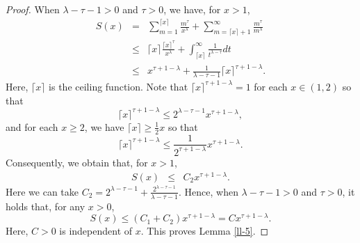 \documentclass[10pt]{amsart}
\theoremstyle{definition}    %
\numberwithin{equation}{section}
\begin{document}
\begin{proof}
When $\lambda-\tau-1>0$ and $\tau>0$, we have, for $x>1$, 
\begin{eqnarray}\label{s-2}
S(x)&=&\sum_{m=1}^{\lceil x \rceil}\frac{m^{\tau}}{x^{\lambda}}+\sum_{m=\lceil x \rceil+1}^{\infty}\frac{m^{\tau}}{m^{\lambda}}\nonumber \\
&\leq&  \lceil x \rceil \frac{\lceil x \rceil^{\tau}}{x^{\lambda}}+\int_{\lceil x \rceil}^{\infty}\frac{1}{t^{\lambda-\tau}}dt\nonumber \\
&\leq & x^{\tau+1-\lambda}+\frac{1}{\lambda-\tau-1}\lceil x \rceil^{\tau+1-\lambda}.\nonumber
\end{eqnarray}
Here, $\lceil x \rceil$ is the ceiling function. Note that $\lceil x \rceil^{\tau+1-\lambda}=1$ for each $x\in (1,2)$ so that
$$\lceil x \rceil^{\tau+1-\lambda}\leq 2^{\lambda-\tau-1}x^{\tau+1-\lambda},$$
 and for each $x\geq 2$, we have $\lceil x \rceil\geq \frac{1}{2}x$ so that
$$\lceil x \rceil^{\tau+1-\lambda} \leq \frac{1}{2^{\tau+1-\lambda}}x^{\tau+1-\lambda}.$$ 
Consequently, we obtain that, for $x>1$, 
\begin{eqnarray}
S(x)&\leq & C_2 x^{\tau+1-\lambda}. \nonumber 
\end{eqnarray}
Here we can take 
$C_2=2^{\lambda-\tau-1}+\frac{2^{\lambda-\tau-1}}{\lambda-\tau-1}.$
Hence, when $\lambda-\tau-1>0$ and $\tau>0$, it holds that, for any $x>0$, 
$$S(x)\leq (C_1+C_2)x^{\tau+1-\lambda}=C x^{\tau+1-\lambda}.$$
Here, $C>0$ is independent of $x$. This proves Lemma \ref{ll-5}.
\end{proof}
\end{document}
